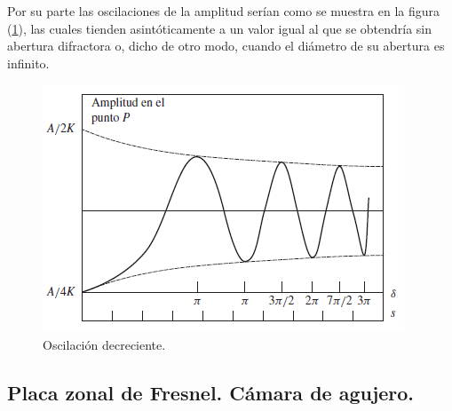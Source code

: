 \documentclass[14pt]{extarticle}
\begin{document}
Por su parte las oscilaciones de la amplitud serían como se muestra en la figura (\ref{fig:figura_X_13}), las cuales tienden asintóticamente a un valor igual al que se obtendría sin abertura difractora o, dicho de otro modo, cuando el diámetro de su abertura es infinito.
\begin{figure}[H]
    \centering
    \includegraphics[scale=1]{Imagenes/Difraccion_13.png}
    \caption{Oscilación decreciente.}
    \label{fig:figura_X_13}
\end{figure}

\subsection{Placa zonal de Fresnel. Cámara de agujero.}
\end{document}
